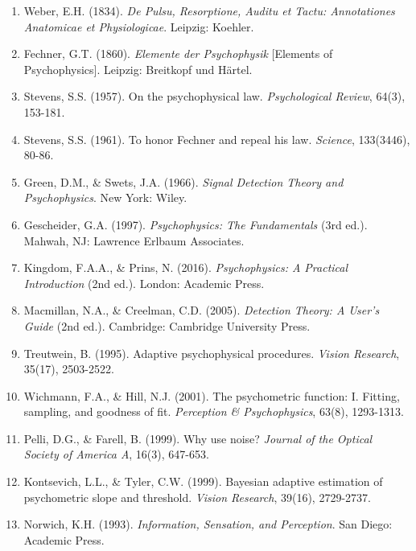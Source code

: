 \documentclass[11pt,a4paper]{article}
\begin{document}
\begin{enumerate}
\item Weber, E.H. (1834). \textit{De Pulsu, Resorptione, Auditu et Tactu: Annotationes Anatomicae et Physiologicae}. Leipzig: Koehler.

\item Fechner, G.T. (1860). \textit{Elemente der Psychophysik} [Elements of Psychophysics]. Leipzig: Breitkopf und Härtel.

\item Stevens, S.S. (1957). On the psychophysical law. \textit{Psychological Review}, 64(3), 153-181.

\item Stevens, S.S. (1961). To honor Fechner and repeal his law. \textit{Science}, 133(3446), 80-86.

\item Green, D.M., \& Swets, J.A. (1966). \textit{Signal Detection Theory and Psychophysics}. New York: Wiley.

\item Gescheider, G.A. (1997). \textit{Psychophysics: The Fundamentals} (3rd ed.). Mahwah, NJ: Lawrence Erlbaum Associates.

\item Kingdom, F.A.A., \& Prins, N. (2016). \textit{Psychophysics: A Practical Introduction} (2nd ed.). London: Academic Press.

\item Macmillan, N.A., \& Creelman, C.D. (2005). \textit{Detection Theory: A User's Guide} (2nd ed.). Cambridge: Cambridge University Press.

\item Treutwein, B. (1995). Adaptive psychophysical procedures. \textit{Vision Research}, 35(17), 2503-2522.

\item Wichmann, F.A., \& Hill, N.J. (2001). The psychometric function: I. Fitting, sampling, and goodness of fit. \textit{Perception \& Psychophysics}, 63(8), 1293-1313.

\item Pelli, D.G., \& Farell, B. (1999). Why use noise? \textit{Journal of the Optical Society of America A}, 16(3), 647-653.

\item Kontsevich, L.L., \& Tyler, C.W. (1999). Bayesian adaptive estimation of psychometric slope and threshold. \textit{Vision Research}, 39(16), 2729-2737.

\item Norwich, K.H. (1993). \textit{Information, Sensation, and Perception}. San Diego: Academic Press.


\end{enumerate}
\end{document}
